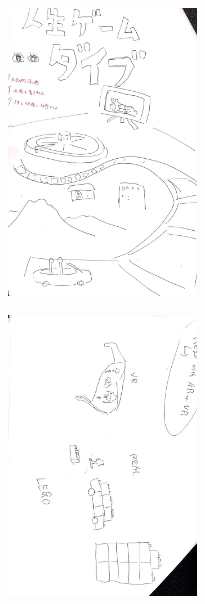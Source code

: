 \documentclass{funthesis}
\begin{document}
\begin{figure}[H]
 \begin{minipage}{0.47\hsize}
 \begin{center}
\includegraphics[width=50mm]{figures/group7.jpg}
 \end{center}
 \label{fig:seven}
 \end{minipage}
 \begin{minipage}{0.47\hsize}
 \begin{center}
 \includegraphics[width=50mm]{figures/group8.jpg}
 \end{center}
 \label{fig:eight}
 \end{minipage}
\end{figure}
\end{document}
